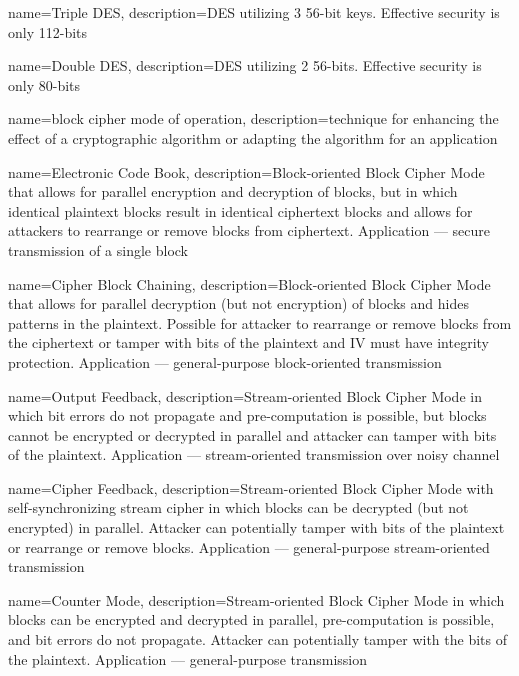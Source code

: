 {
    name={Triple DES},
    description={DES utilizing 3 56-bit keys. Effective security is only 112-bits}
}


{
    name={Double DES},
    description={DES utilizing 2 56-bits. Effective security is only 80-bits}
}

{
    name={block cipher mode of operation},
    description={technique for enhancing the effect of a cryptographic algorithm or adapting the algorithm for an application}
}

{
    name={Electronic Code Book},
    description={Block-oriented Block Cipher Mode that allows for parallel encryption and decryption of blocks, but in which identical plaintext blocks result in identical ciphertext blocks and allows for attackers to rearrange or remove blocks from ciphertext. Application --- secure transmission of a single block}
}

{
    name={Cipher Block Chaining},
    description={Block-oriented Block Cipher Mode that allows for parallel decryption (but not encryption) of blocks and hides patterns in the plaintext. Possible for attacker to rearrange or remove blocks from the ciphertext or tamper with bits of the plaintext and IV must have integrity protection. Application --- general-purpose block-oriented transmission}
}

{
    name={Output Feedback},
    description={Stream-oriented Block Cipher Mode in which bit errors do not propagate and pre-computation is possible, but blocks cannot be encrypted or decrypted in parallel and attacker can tamper with bits of the plaintext. Application --- stream-oriented transmission over noisy channel}
}

{
    name={Cipher Feedback},
    description={Stream-oriented Block Cipher Mode with self-synchronizing stream cipher in which blocks can be decrypted (but not encrypted) in parallel. Attacker can potentially tamper with bits of the plaintext or rearrange or remove blocks. Application --- general-purpose stream-oriented transmission}
}

{
    name={Counter Mode},
    description={Stream-oriented Block Cipher Mode in which blocks can be encrypted and decrypted in parallel, pre-computation is possible, and bit errors do not propagate. Attacker can potentially tamper with the bits of the plaintext. Application --- general-purpose transmission}
}

